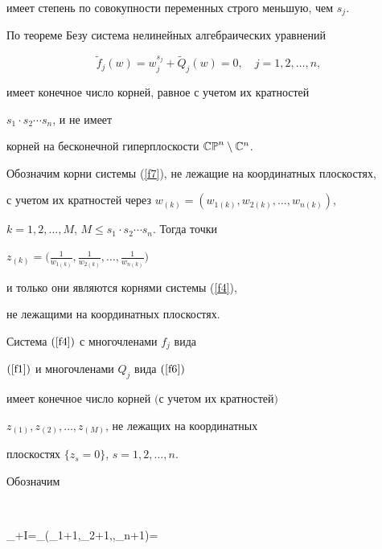 имеет степень по совокупности переменных строго меньшую, чем $s_j$.





По теореме Безу система нелинейных алгебраических уравнений


\begin{equation}\label{f7}


\widetilde f_j(w)=w_j^{s_j}+\widetilde Q_j(w)=0,\quad j=1,2,\dotsc, n,


\end{equation}


имеет конечное число корней, равное с учетом их кратностей


$s_1\cdot s_2\dotsb s_n$, и не имеет


корней на бесконечной гиперплоскости $\Bbb{CP}^n\setminus\Bbb C^n$.


Обозначим корни системы (\ref{f7}), не лежащие на координатных плоскостях,


с учетом их кратностей через $w_{(k)}=(w_{1(k)},w_{2(k)},\dotsc,w_{n(k)})$,


$k=1,2,\dotsc, M$, $M\leqslant s_1\cdot s_2\dotsb s_n$. Тогда точки


$z_{(k)}=\big(\frac 1{w_{1(k)}},


\frac 1{w_{2(k)}},\dotsc,\frac 1{w_{n(k)}}\big)$


и только они являются корнями системы (\ref{f4}), 


не лежащими на координатных плоскостях.








\begin{lemnonum} %


Система  $(\ref{f4})$ с многочленами $f_j$ вида


$(\ref{f1})$ и многочленами $Q_j$  вида $(\ref{f6})$


имеет конечное число корней $($с учетом их кратностей\/$)$


$z_{(1)}, z_{(2)},\dotsc,z_{(M)}$, не лежащих на координатных 


плоскостях $\{z_s=0\}$, $s=1,2,\dotsc,n$.


\end{lemnonum}





Обозначим


$$


\sigma_{\beta+I}=\sigma_{(\beta_1+1,\beta_2+1,\dotsc,\beta_n+1)}=


